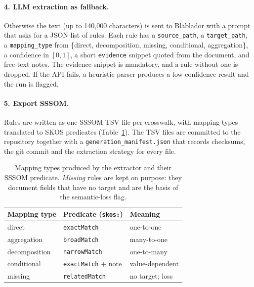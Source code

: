 \documentclass[10pt,twocolumn,a4paper]{extarticle}
\begin{document}
\paragraph{4. LLM extraction as fallback.} Otherwise the text (up to
140,000 characters) is sent to Blablador with a prompt that asks for a JSON
list of rules. Each rule has a \texttt{source\_path}, a \texttt{target\_path}, a
\texttt{mapping\_type} from \{direct, decomposition, missing, conditional, aggregation\},
a confidence in $[0,1]$, a short \texttt{evidence} snippet quoted from the
document, and free-text notes. The evidence snippet is mandatory, and a rule
without one is dropped. If the API fails, a heuristic parser produces a
low-confidence result and the run is flagged.

\paragraph{5. Export SSSOM.} Rules are written as one SSSOM TSV file per
crosswalk, with mapping types translated to SKOS predicates
(Table~\ref{tab:predicates}). The TSV files are committed to the repository
together with a \texttt{generation\_manifest.json} that records checksums,
the git commit and the extraction strategy for every file.

\begin{table}[t]
  \centering\small
  \caption{Mapping types produced by the extractor and their SSSOM
  predicate. \emph{Missing} rules are kept on purpose: they document
  fields that have no target and are the basis of the semantic-loss
  flag.}
  \label{tab:predicates}
  \begin{tabular}{@{}lll@{}}
    \toprule
    Mapping type & Predicate (\texttt{skos:}) & Meaning \\
    \midrule
    direct       & \texttt{exactMatch}   & one-to-one \\
    aggregation  & \texttt{broadMatch}   & many-to-one \\
    decomposition& \texttt{narrowMatch}  & one-to-many \\
    conditional  & \texttt{exactMatch} + note & value-dependent \\
    missing      & \texttt{relatedMatch} & no target; loss \\
    \bottomrule
  \end{tabular}
\end{table}
\end{document}
